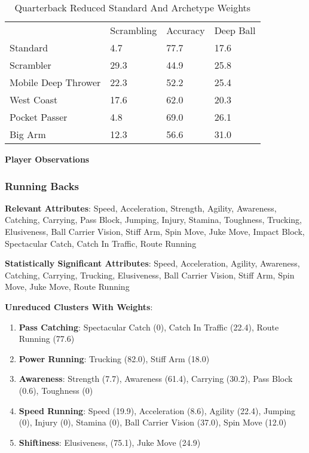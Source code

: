 \documentclass[11pt]{article}
\begin{document}
\begin{table}[]
\centering
\caption{Quarterback Reduced Standard And Archetype Weights}
\label{QuarterbackReducedWeights}
\begin{tabular}{llll}
                    & Scrambling & Accuracy & Deep Ball \\
Standard            & 4.7        & 77.7     & 17.6      \\
Scrambler           & 29.3       & 44.9     & 25.8      \\
Mobile Deep Thrower & 22.3       & 52.2     & 25.4      \\
West Coast          & 17.6       & 62.0     & 20.3      \\
Pocket Passer       & 4.8        & 69.0     & 26.1      \\
Big Arm             & 12.3       & 56.6     & 31.0     
\end{tabular}
\end{table}

\textbf{Player Observations}

\subsubsection{Running Backs}

\textbf{Relevant Attributes}: Speed, Acceleration, Strength, Agility, Awareness, Catching, Carrying, Pass Block, Jumping, Injury, Stamina, Toughness, Trucking, Elusiveness, Ball Carrier Vision, Stiff Arm, Spin Move, Juke Move, Impact Block, Spectacular Catch, Catch In Traffic, Route Running

\textbf{Statistically Significant Attributes}: Speed, Acceleration, Agility, Awareness, Catching, Carrying, Trucking, Elusiveness, Ball Carrier Vision, Stiff Arm, Spin Move, Juke Move, Route Running

\textbf{Unreduced Clusters With Weights}:

\begin{enumerate}
\item{\textbf{Pass Catching}}: Spectacular Catch (0), Catch In Traffic (22.4), Route Running (77.6)
\item{\textbf{Power Running}}: Trucking (82.0), Stiff Arm (18.0)
\item{\textbf{Awareness}}: Strength (7.7), Awareness (61.4), Carrying (30.2), Pass Block (0.6), Toughness (0)
\item{\textbf{Speed Running}}: Speed (19.9), Acceleration (8.6), Agility (22.4), Jumping (0), Injury (0), Stamina (0), Ball Carrier Vision (37.0), Spin Move (12.0)
\item{\textbf{Shiftiness}}: Elusiveness, (75.1), Juke Move (24.9)
\end{enumerate}
\end{document}
